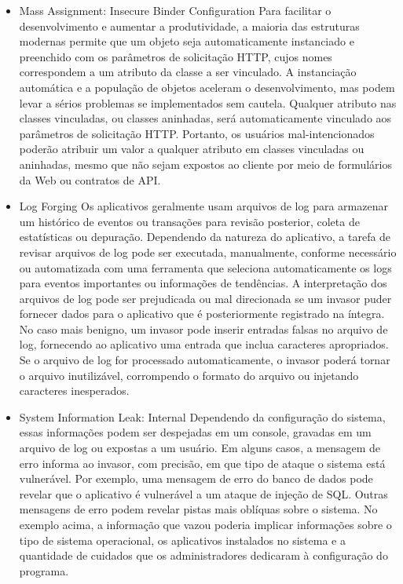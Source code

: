 \documentclass[12pt]{article}
\begin{document}
\begin{itemize}
 \item Mass Assignment: Insecure Binder Configuration
  \subitem Para facilitar o desenvolvimento e aumentar a produtividade, a maioria das estruturas modernas permite que um objeto seja automaticamente instanciado e preenchido com os parâmetros de solicitação HTTP, cujos nomes correspondem a um atributo da classe a ser vinculado. A instanciação automática e a população de objetos aceleram o desenvolvimento, mas podem levar a sérios problemas se implementados sem cautela. Qualquer atributo nas classes vinculadas, ou classes aninhadas, será automaticamente vinculado aos parâmetros de solicitação HTTP. Portanto, os usuários mal-intencionados poderão atribuir um valor a qualquer atributo em classes vinculadas ou aninhadas, mesmo que não sejam expostos ao cliente por meio de formulários da Web ou contratos de API.

 \item Log Forging
  \subitem Os aplicativos geralmente usam arquivos de log para armazenar um histórico de eventos ou transações para revisão posterior, coleta de estatísticas ou depuração.
 Dependendo da natureza do aplicativo, a tarefa de revisar arquivos de log pode ser executada, manualmente, conforme necessário ou automatizada com uma ferramenta que seleciona automaticamente os logs para eventos importantes ou informações de tendências.
A interpretação dos arquivos de log pode ser prejudicada ou mal direcionada se um invasor puder fornecer dados para o aplicativo que é posteriormente registrado na íntegra. No caso mais benigno, um invasor pode inserir entradas falsas no arquivo de log, fornecendo ao aplicativo uma entrada que inclua caracteres apropriados. Se o arquivo de log for processado automaticamente, o invasor poderá tornar o arquivo inutilizável, corrompendo o formato do arquivo ou injetando caracteres inesperados.

 \item System Information Leak: Internal
  \subitem Dependendo da configuração do sistema, essas informações podem ser despejadas em um console, gravadas em um arquivo de log ou expostas a um usuário. Em alguns casos, a mensagem de erro informa ao invasor, com precisão, em que tipo de ataque o sistema está vulnerável. Por exemplo, uma mensagem de erro do banco de dados pode revelar que o aplicativo é vulnerável a um ataque de injeção de SQL. Outras mensagens de erro podem revelar pistas mais oblíquas sobre o sistema. No exemplo acima, a informação que vazou poderia implicar informações sobre o tipo de sistema operacional, os aplicativos instalados no sistema e a quantidade de cuidados que os administradores dedicaram à configuração do programa.
\end{itemize}
\end{document}
